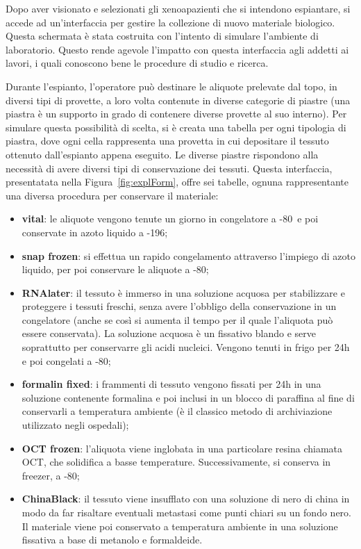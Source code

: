 Dopo aver visionato e selezionati gli xenoapazienti che si intendono espiantare, si accede ad un'interfaccia per gestire la collezione di nuovo materiale biologico. Questa schermata \`e stata costruita con l'intento di simulare l'ambiente di laboratorio. Questo rende agevole l'impatto con questa interfaccia agli addetti ai lavori, i quali conoscono bene le procedure di studio e ricerca.

Durante l'espianto, l'operatore pu\`o destinare le aliquote prelevate dal topo, in diversi tipi di provette, a loro volta contenute in diverse categorie di piastre (una piastra \`e un supporto in grado di contenere diverse provette al suo interno). Per simulare questa possibilit\`a di scelta, si \`e creata una tabella per ogni tipologia di piastra, dove ogni cella rappresenta una provetta in cui depositare il tessuto ottenuto dall'espianto appena eseguito. Le diverse piastre rispondono alla necessit\`a di avere diversi tipi di conservazione dei tessuti. Questa interfaccia, presentatata nella Figura~\ref{fig:explForm}, offre sei tabelle, ognuna rappresentante una diversa procedura per conservare il materiale:
\begin{itemize}
	\item \textbf{vital}: le aliquote vengono tenute un giorno in congelatore a -80\textcelsius\ e poi conservate in azoto liquido a -196\textcelsius;
	\item \textbf{snap frozen}: si effettua un rapido congelamento attraverso l'impiego di azoto liquido, per poi conservare le aliquote a -80\textcelsius;
	\item \textbf{RNAlater}: il tessuto \`e immerso in una soluzione acquosa per stabilizzare e proteggere i tessuti freschi, senza avere l'obbligo della conservazione in un congelatore (anche se cos\`i si aumenta il tempo per il quale l'aliquota pu\`o essere conservata). La soluzione acquosa \`e un fissativo blando e serve soprattutto per conservarre gli acidi nucleici. Vengono tenuti in frigo per 24h e poi congelati a -80\textcelsius;
	\item \textbf{formalin fixed}: i frammenti di tessuto vengono fissati per 24h in una soluzione contenente formalina e poi inclusi in un blocco di paraffina al fine di conservarli a temperatura ambiente (\`e il classico metodo di archiviazione utilizzato negli ospedali);
	\item \textbf{OCT frozen}: l'aliquota viene inglobata in una particolare resina chiamata OCT, che solidifica a basse temperature. Successivamente, si conserva in freezer, a -80\textcelsius;
	\item \textbf{ChinaBlack}: il tessuto viene insufflato con una soluzione di nero di china in modo da far risaltare eventuali metastasi come punti chiari su un fondo nero. Il materiale viene poi conservato a temperatura ambiente in una soluzione fissativa a base di metanolo e formaldeide. 
\end{itemize}

